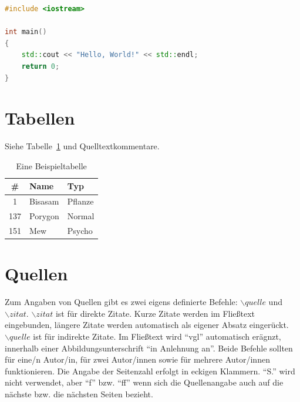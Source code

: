 \documentclass{iwi}
\begin{document}
\begin{lstlisting}[float, caption={Hello, World!}, label={lst:helloWorld}, language=C++] 
#include <iostream>

int main() 
{
    std::cout << "Hello, World!" << std::endl;
    return 0;
}
\end{lstlisting}

\section{Tabellen} \label{sec:Tabellen}

Siehe Tabelle~\ref{tbl:pokemon} und Quelltextkommentare.

\begin{table}
\begin{center}
\begin{tabular}{c|ll} %
	\# & Name & Typ	\\
	\hline   
	1      & Bisasam   & Pflanze   \\
	137    & Porygon   & Normal    \\
	151    & Mew       & Psycho    \\

\end{tabular}
\caption{Eine Beispieltabelle}
\label{tbl:pokemon}
\end{center}
\end{table}

\section{Quellen}

Zum Angaben von Quellen gibt es zwei eigens definierte Befehle: $\backslash quelle$ und $\backslash zitat$.
$\backslash zitat$ ist für direkte Zitate. Kurze Zitate werden im Fließtext eingebunden, längere Zitate werden automatisch als eigener Absatz eingerückt.
$\backslash quelle$ ist für indirekte Zitate. 
Im Fließtext wird ``vgl'' automatisch erägnzt, innerhalb einer Abbildungsunterschrift ``in Anlehnung an''. 
Beide Befehle sollten für eine/n Autor/in, für zwei Autor/innen sowie für mehrere Autor/innen funktionieren.
Die Angabe der Seitenzahl erfolgt in eckigen Klammern. ``S.'' wird nicht verwendet, aber ``f'' bzw. ``ff'' wenn sich die Quellenangabe auch auf die nächste bzw. die nächsten Seiten bezieht.
\end{document}
